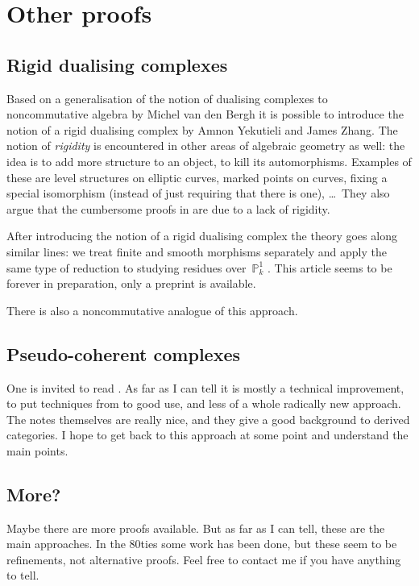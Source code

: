 \documentclass[10pt,a4paper]{article}
\begin{document}
\section{Other proofs}
\label{section:other}
\subsection{Rigid dualising complexes}
\label{subsection:yekutieli-zhang}
Based on a generalisation of the notion of dualising complexes to noncommutative algebra \cite{van-den-bergh-dualizing-complexes} by Michel van den Bergh it is possible to introduce the notion of a rigid dualising complex \cite{yekutieli-zhang-rigid-dualizing-complexes} by Amnon Yekutieli and James Zhang. The notion of \emph{rigidity} is encountered in other areas of algebraic geometry as well: the idea is to add more structure to an object, to kill its automorphisms. Examples of these are level structures on elliptic curves, marked points on curves, fixing a special isomorphism (instead of just requiring that there is one), \ldots\ They also argue that the cumbersome proofs in \cite{hartshorne-residues-and-duality} are due to a lack of rigidity.

After introducing the notion of a rigid dualising complex the theory goes along similar lines: we treat finite and smooth morphisms separately and apply the same type of reduction to studying residues over~$\mathbb{P}_k^1$ \cite{yekutieli-zhang-rigid-dualizing-complexes-on-schemes}. This article seems to be forever in preparation, only a preprint is available.

There is also a noncommutative analogue of this approach.

\subsection{Pseudo-coherent complexes}
\label{subsection:lipman}
One is invited to read \cite{lipman-notes-on-grothendieck-duality}. As far as I can tell it is mostly a technical improvement, to put techniques from \cite{sga6} to good use, and less of a whole radically new approach. The notes themselves are really nice, and they give a good background to derived categories. I hope to get back to this approach at some point and understand the main points.

\subsection{More?}
Maybe there are more proofs available. But as far as I can tell, these are the main approaches. In the 80ties some work has been done, but these seem to be refinements, not alternative proofs. Feel free to contact me if you have anything to tell.


\printbibliography
\end{document}
